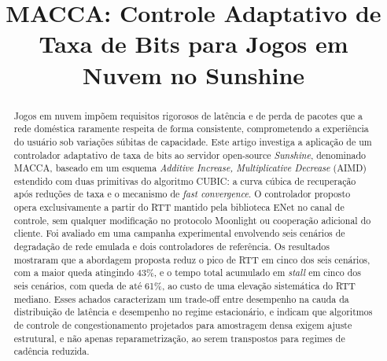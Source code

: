 \documentclass[conference]{IEEEtran}
\begin{document}
\title{MACCA: Controle Adaptativo de Taxa de Bits para Jogos em Nuvem no Sunshine}

\author{
\and
{}
}

\maketitle


\begin{abstract}
Jogos em nuvem impõem requisitos rigorosos de latência e de
perda de pacotes que a rede doméstica raramente respeita de
forma consistente, comprometendo a experiência do usuário
sob variações súbitas de capacidade. Este artigo investiga a
aplicação de um controlador adaptativo de taxa de bits ao
servidor open-source \emph{Sunshine}, denominado MACCA, baseado em um esquema
\emph{Additive Increase, Multiplicative Decrease} (AIMD)
estendido com duas primitivas do algoritmo CUBIC: a curva
cúbica de recuperação após reduções de taxa e o mecanismo de
\emph{fast convergence}. O controlador proposto opera
exclusivamente a partir do RTT mantido pela biblioteca ENet
no canal de controle, sem qualquer modificação no protocolo
Moonlight ou cooperação adicional do cliente. Foi avaliado
em uma campanha experimental envolvendo seis cenários de
degradação de rede emulada e dois controladores de
referência. Os resultados mostraram que a abordagem proposta
reduz o pico de RTT em cinco dos seis cenários, com a maior
queda atingindo 43\%, e o tempo total acumulado em
\emph{stall} em cinco dos seis cenários, com queda de até
61\%, ao custo de uma elevação sistemática do RTT mediano.
Esses achados caracterizam um trade-off entre desempenho na
cauda da distribuição de latência e desempenho no regime
estacionário, e indicam que algoritmos de controle de
congestionamento projetados para amostragem densa exigem
ajuste estrutural, e não apenas reparametrização, ao serem
transpostos para regimes de cadência reduzida.
\end{abstract}
\end{document}
